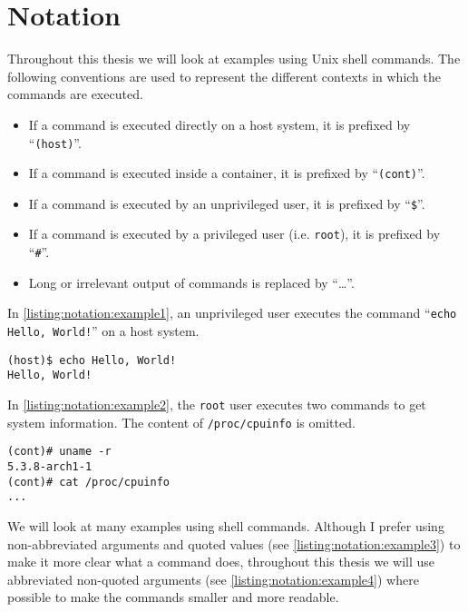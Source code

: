 \chapter{Notation}\label{chapter:notation}
Throughout this thesis we will look at examples using Unix shell commands. The following conventions are used to represent the different contexts in which the commands are executed.

\begin{itemize}
    \item If a command is executed directly on a host system, it is prefixed by ``\lstinline{(host)}''.
    \item If a command is executed inside a container, it is prefixed by ``\lstinline{(cont)}''.
    \item If a command is executed by an unprivileged user, it is prefixed by ``\lstinline{$}''.
    \item If a command is executed by a privileged user (i.e. \lstinline{root}), it is prefixed by ``\lstinline{#}''.
    \item Long or irrelevant output of commands is replaced by ``\ldots''.
\end{itemize}

In \autoref{listing:notation:example1}, an unprivileged user executes the command ``\lstinline{echo Hello, World!}'' on a host system.
\begin{lstlisting}[caption={Shell command notation example 1.}, captionpos=b, label={listing:notation:example1}]
(host)$ echo Hello, World!
Hello, World!
\end{lstlisting}

\medskip

In \autoref{listing:notation:example2}, the \lstinline{root} user executes two commands to get system information. The content of \lstinline{/proc/cpuinfo} is omitted.
\begin{lstlisting}[caption={Shell command notation example 2.}, captionpos=b, label={listing:notation:example2}]
(cont)# uname -r
5.3.8-arch1-1
(cont)# cat /proc/cpuinfo
...
\end{lstlisting}

\medskip

We will look at many examples using shell commands. Although I prefer using non-abbreviated arguments and quoted values (see \autoref{listing:notation:example3}) to make it more clear what a command does, throughout this thesis we will use abbreviated non-quoted arguments (see \autoref{listing:notation:example4}) where possible to make the commands smaller and more readable.

